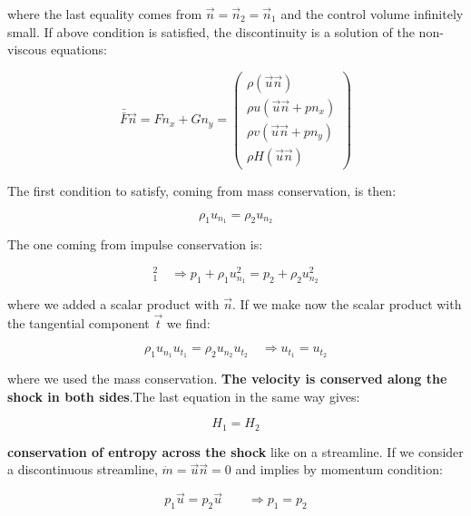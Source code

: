 	where the last equality comes from $\vec{n} = \vec{n}_2 = \vec{n}_1$ and the control volume infinitely small. If above condition is satisfied, the discontinuity is a solution of the non-viscous equations: 
	
	\begin{equation}
	\bar{\bar{F}}\vec{n} = F n_x + Gn_y = \left( \begin{array}{c}
	\rho (\vec{u}\vec{n})\\
	\rho u (\vec{u} \vec{n} + pn_x)\\
	\rho v (\vec{u} \vec{n} + pn_y)\\
	\rho H (\vec{u}\vec{n})	
	\end{array}
	\right)
	\end{equation}
	
	The first condition to satisfy, coming from mass conservation, is then: 
	
	\begin{equation}
	\rho _1 u_{n_1} = \rho _2 u_{n_2}
	\end{equation}
	
	The one coming from impulse conservation is: 
	
	\begin{equation}
	[\rho \vec{u}(\vec{u}\vec{n})+p\vec{n}]^2_1 \quad \Rightarrow p_1 + \rho _1 u_{n_1}^2 = p_2 + \rho _2 u_{n_2}^2
	\end{equation}
	
	where we added a scalar product with $\vec{n}$. If we make now the scalar product with the tangential component $\vec{t}$ we find: 
	
	\begin{equation}
	\rho _1 u_{n_1} u_{t_1} = \rho _2 u_{n_2} u_{t_2}\quad \Rightarrow u_{t_1} =u_{t_2}
	\end{equation}
	
	where we used the mass conservation. \textbf{The velocity is conserved along the shock in both sides}.The last equation in the same way gives: 
	
	\begin{equation}
	H_1 = H_2
	\end{equation}
	
	\textbf{conservation of entropy across the shock} like on a streamline. If we consider a discontinuous streamline, $\dot{m} = \vec{u}\vec{n} = 0$ and implies by momentum condition: 
	
	\begin{equation}
	p_1 \vec{u} = p_2 \vec{u} \qquad \Rightarrow p_1 = p_2
	\end{equation}
	
